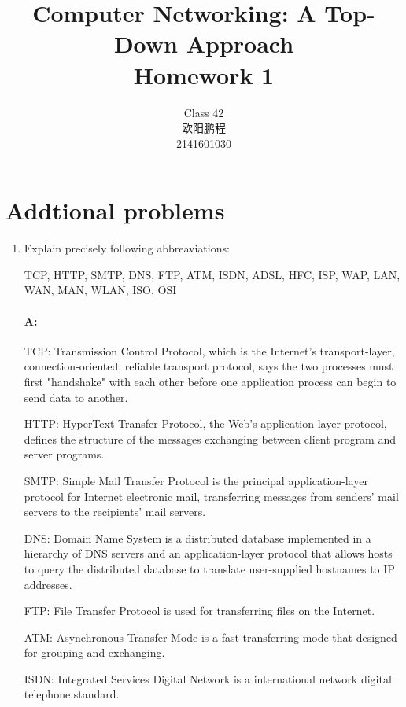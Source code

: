 \documentclass[]{article}
\title{Computer Networking: A Top-Down Approach \\ Homework 1}
\author{Class 42 \\ 欧阳鹏程 \\ 2141601030}
\begin{document}
\maketitle


\section{Addtional problems}

\begin{enumerate}
	\item 
	Explain precisely following abbreaviations:
	\begin{itemize}
		\subitem
		TCP,
		HTTP,
		SMTP,
		DNS,
		FTP,
		ATM,
		ISDN,
		ADSL,
		HFC,
		ISP,
		WAP,
		LAN,
		WAN,
		MAN,
		WLAN,
		ISO,
		OSI
	\end{itemize}

	\paragraph{A:}
	TCP: Transmission Control Protocol, which is the Internet's transport-layer, connection-oriented, reliable transport protocol, says the two processes must first "handshake" with each other before one application process can begin to send data to another.
	
	\begin{adjustwidth}{0.05cm}{0cm}
		\qquad HTTP: HyperText Transfer Protocol, the Web's application-layer protocol, defines the structure of the messages exchanging between client program and server programs.
		
		\qquad SMTP: Simple Mail Transfer Protocol is the principal application-layer protocol for Internet electronic mail, transferring messages from senders' mail servers to the recipients' mail servers.
		
		\qquad DNS: Domain Name System is a distributed database implemented in a hierarchy of DNS servers and an application-layer protocol that allows hosts to query the distributed database to translate user-supplied hostnames to IP addresses.
		
		\qquad FTP: File Transfer Protocol is used for transferring files on the Internet.
		
		\qquad ATM: Asynchronous Transfer Mode is a fast transferring mode that designed for grouping and exchanging.
		
		\qquad ISDN: Integrated Services Digital Network is a international network digital telephone standard.
		

\end{adjustwidth}
\end{enumerate}
\end{document}

